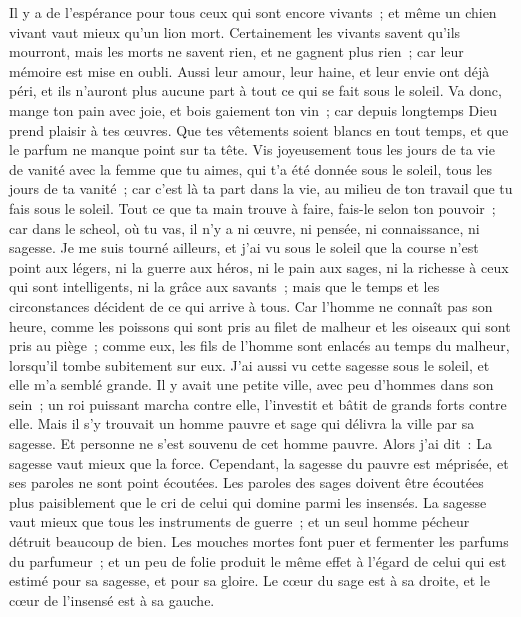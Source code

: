\begin{multicols}{2}
Il y a de l'espérance pour tous ceux qui sont encore vivants~; et même un chien vivant vaut mieux qu'un lion mort.
Certainement les vivants savent qu'ils mourront, mais les morts ne savent rien, et ne gagnent plus rien~; car leur mémoire est mise en oubli.
Aussi leur amour, leur haine, et leur envie ont déjà péri, et ils n'auront plus aucune part à tout ce qui se fait sous le soleil.
Va donc, mange ton pain avec joie, et bois gaiement ton vin~; car depuis longtemps Dieu prend plaisir à tes œuvres.
Que tes vêtements soient blancs en tout temps, et que le parfum ne manque point sur ta tête.
Vis joyeusement tous les jours de ta vie de vanité avec la femme que tu aimes, qui t'a été donnée sous le soleil, tous les jours de ta vanité~; car c'est là ta part dans la vie, au milieu de ton travail que tu fais sous le soleil.
Tout ce que ta main trouve à faire, fais-le selon ton pouvoir~; car dans le scheol, où tu vas, il n'y a ni œuvre, ni pensée, ni connaissance, ni sagesse.
Je me suis tourné ailleurs, et j'ai vu sous le soleil que la course n'est point aux légers, ni la guerre aux héros, ni le pain aux sages, ni la richesse à ceux qui sont intelligents, ni la grâce aux savants~; mais que le temps et les circonstances décident de ce qui arrive à tous.
Car l'homme ne connaît pas son heure, comme les poissons qui sont pris au filet de malheur et les oiseaux qui sont pris au piège~; comme eux, les fils de l'homme sont enlacés au temps du malheur, lorsqu'il tombe subitement sur eux.
J'ai aussi vu cette sagesse sous le soleil, et elle m'a semblé grande.
Il y avait une petite ville, avec peu d'hommes dans son sein~; un roi puissant marcha contre elle, l'investit et bâtit de grands forts contre elle.
Mais il s'y trouvait un homme pauvre et sage qui délivra la ville par sa sagesse. Et personne ne s'est souvenu de cet homme pauvre.
Alors j'ai dit~: La sagesse vaut mieux que la force. Cependant, la sagesse du pauvre est méprisée, et ses paroles ne sont point écoutées.
Les paroles des sages doivent être écoutées plus paisiblement que le cri de celui qui domine parmi les insensés.
La sagesse vaut mieux que tous les instruments de guerre~; et un seul homme pécheur détruit beaucoup de bien.
\VerseOne{} Les mouches mortes font puer et fermenter les parfums du parfumeur~; et un peu de folie produit le même effet à l'égard de celui qui est estimé pour sa sagesse, et pour sa gloire.
Le cœur du sage est à sa droite, et le cœur de l'insensé est à sa gauche.

\end{multicols}
